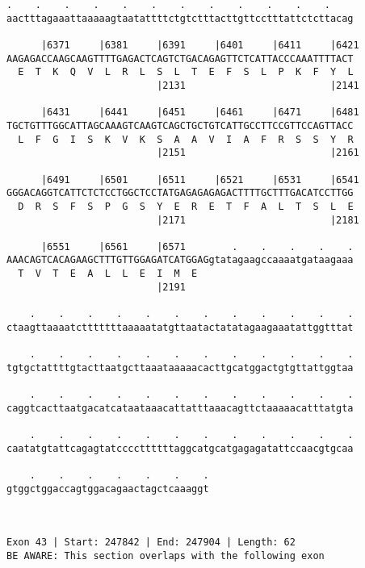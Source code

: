 \documentclass{article}
\begin{document}
\begin{Verbatim}
.    .    .    .    .    .    .    .    .    .    .    .    
aactttagaaattaaaaagtaatattttctgtctttacttgttcctttattctcttacag
                                                            
      |6371     |6381     |6391     |6401     |6411     |6421
AAGAGACCAAGCAAGTTTTGAGACTCAGTCTGACAGAGTTCTCATTACCCAAATTTTACT
  E  T  K  Q  V  L  R  L  S  L  T  E  F  S  L  P  K  F  Y  L
                          |2131                         |2141
  
      |6431     |6441     |6451     |6461     |6471     |6481
TGCTGTTTGGCATTAGCAAAGTCAAGTCAGCTGCTGTCATTGCCTTCCGTTCCAGTTACC
  L  F  G  I  S  K  V  K  S  A  A  V  I  A  F  R  S  S  Y  R
                          |2151                         |2161
  
      |6491     |6501     |6511     |6521     |6531     |6541
GGGACAGGTCATTCTCTCCTGGCTCCTATGAGAGAGAGACTTTTGCTTTGACATCCTTGG
  D  R  S  F  S  P  G  S  Y  E  R  E  T  F  A  L  T  S  L  E
                          |2171                         |2181
  
      |6551     |6561     |6571        .    .    .    .    .
AAACAGTCACAGAAGCTTTGTTGGAGATCATGGAGgtatagaagccaaaatgataagaaa
  T  V  T  E  A  L  L  E  I  M  E                           
                          |2191                             
  
    .    .    .    .    .    .    .    .    .    .    .    .
ctaagttaaaatctttttttaaaaatatgttaatactatatagaagaaatattggtttat
                                                            
    .    .    .    .    .    .    .    .    .    .    .    .
tgtgctattttgtacttaatgcttaaataaaaacacttgcatggactgtgttattggtaa
                                                            
    .    .    .    .    .    .    .    .    .    .    .    .
caggtcacttaatgacatcataataaacattatttaaacagttctaaaaacatttatgta
                                                            
    .    .    .    .    .    .    .    .    .    .    .    .
caatatgtattcagagtatccccttttttaggcatgcatgagagatattccaacgtgcaa
                                                            
    .    .    .    .    .    .    .
gtggctggaccagtggacagaactagctcaaaggt
                                   
                                   
 
Exon 43 | Start: 247842 | End: 247904 | Length: 62
BE AWARE: This section overlaps with the following exon




\end{Verbatim}
\end{document}
